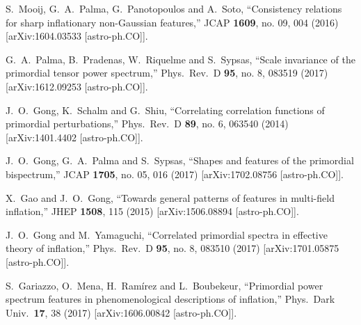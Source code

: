 \documentclass[12pt]{article}
\begin{document}
\begin{thebibliography}{99}
  S.~Mooij, G.~A.~Palma, G.~Panotopoulos and A.~Soto,
  ``Consistency relations for sharp inflationary non-Gaussian features,''
  JCAP {\bf 1609}, no. 09, 004 (2016)
  [arXiv:1604.03533 [astro-ph.CO]].
    
  G.~A.~Palma, B.~Pradenas, W.~Riquelme and S.~Sypsas,
  ``Scale invariance of the primordial tensor power spectrum,''
  Phys.\ Rev.\ D {\bf 95}, no. 8, 083519 (2017)
  [arXiv:1612.09253 [astro-ph.CO]].
  
  
  J.~O.~Gong, K.~Schalm and G.~Shiu,
  ``Correlating correlation functions of primordial perturbations,''
  Phys.\ Rev.\ D {\bf 89}, no. 6, 063540 (2014)
  [arXiv:1401.4402 [astro-ph.CO]].
   



  J.~O.~Gong, G.~A.~Palma and S.~Sypsas,
  ``Shapes and features of the primordial bispectrum,''
  JCAP {\bf 1705}, no. 05, 016 (2017)
  [arXiv:1702.08756 [astro-ph.CO]].
  

  X.~Gao and J.~O.~Gong,
  ``Towards general patterns of features in multi-field inflation,''
  JHEP {\bf 1508}, 115 (2015)
  [arXiv:1506.08894 [astro-ph.CO]].
  
  
  J.~O.~Gong and M.~Yamaguchi,
  ``Correlated primordial spectra in effective theory of inflation,''
  Phys.\ Rev.\ D {\bf 95}, no. 8, 083510 (2017)
  [arXiv:1701.05875 [astro-ph.CO]].
  
  
  
    
  S.~Gariazzo, O.~Mena, H.~Ramírez and L.~Boubekeur,
  ``Primordial power spectrum features in phenomenological descriptions of inflation,''
  Phys.\ Dark Univ.\  {\bf 17}, 38 (2017)
  [arXiv:1606.00842 [astro-ph.CO]].



\end{thebibliography}
\end{document}

